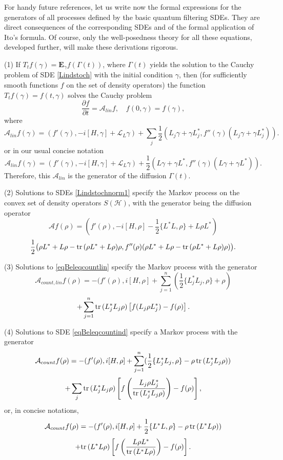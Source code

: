 \documentclass[12pt]{article}
\def\AC{\mathcal{A}}
\def\LC{\mathcal{L}}
\def\HC{\mathcal{H}}
\def\E{\mathbf{E}}
\def\tr{\rm{tr}}
\def\pa{\partial}
\def\ga{\gamma}
\newcommand{\Ga}{\Gamma}
\begin{document}
For handy future references, let us write now the formal expressions for the generators of all processes
defined by the basic quantum filtering SDEs. They are direct consequences of the corresponding SDEs
and of the formal application of Ito's formula. Of course, only the well-posedness theory for all these equations,
developed further, will make these derivations rigorous.

(1) If $T_tf(\ga)=\E_{\ga} f(\Ga(t))$, where $\Ga(t)$ yields the solution
to the Cauchy problem of SDE \eqref{Lindstoch} with the initial condition $\ga$,
then (for sufficiently smooth functions $f$ on the set of density operators)
the function $T_tf(\ga)=f(t,\ga)$ solves the Cauchy problem
\begin{equation}
\label{eqCauchylinfilt}
\frac{\pa f}{\pa t}=\AC_{lin} f, \quad f(0,\ga)=f(\ga),
\end{equation}
where
\begin{equation}
\label{eqgenlinfilt1}
\AC_{lin} f(\ga)= (f'(\ga), -i[H,\ga] +\LC_L \ga) + \sum_j \frac12 (L_j\ga+\ga L_j^*, f''(\ga) (L_j\ga+\ga L_j^*)).
\end{equation}
or in our usual concise notation
\begin{equation}
\label{eqgenlinfilt}
\AC_{lin} f(\ga)= (f'(\ga), -i[H,\ga] +\LC_L \ga) + \frac12 (L\ga+\ga L^*, f''(\ga) (L\ga+\ga L^*)).
\end{equation}
Therefore, this $\AC_{lin}$ is the generator of the diffusion $\Ga(t)$.

(2) Solutions to SDEs  \eqref{Lindstochnorm1} specify the Markov process on the convex
set of density operators  $S(\HC)$, with the generator
being the diffusion operator
\[
\AC f(\rho)=(f'(\rho),-i[H, \rho] -\frac12 \{L^*L,\rho\}+ L\rho L^*)
\]
\begin{equation}
\label{eqdifgener}
\frac12 \bigl(\rho L^* + L\rho-{\tr}\,(\rho L^* +L\rho)  \rho,
f''(\rho) (\rho L^* + L\rho-{\tr}\,(\rho L^* +L\rho)  \rho)\bigr).
\end{equation}

(3) Solutions to \eqref{eqBeleqcountlin} specify the Markov process with the generator
\[
\AC_{count,lin}f(\rho)=-(f'(\rho), i[H, \rho]
+\sum_{j=1}^n \left(\frac12 \{L_j^*L_j,\rho\}+ \rho\right)
\]
 \begin{equation}
\label{eqjumpgenerlin}
+ \sum_{j=1}^n {\tr}\, (L_j^*L_j\rho)\left[f(L_j\rho L_j^*)-f(\rho)\right].
\end{equation}

(4) Solutions to SDE \eqref{eqBeleqcountind}
specify a Markov process with the generator
\[
\AC_{count}f(\rho)=-(f'(\rho), i[H, \rho] +\sum_{j=1}^n (\frac12 \{L_j^*L_j,\rho\}-\rho \, {\tr}\, (L_j^*L_j\rho))
\]
\begin{equation}
\label{eqjumpgenerj}
+\sum_j {\tr}\, (L_j^*L_j\rho) \left[f\left(\frac{L_j\rho L_j^*}{{\tr}\, (L_j^*L_j\rho)}\right)-f(\rho)\right],
\end{equation}
or, in concise notations,
 \[
\AC_{count}f(\rho)=-(f'(\rho), i[H, \rho] + \frac12 \{L^*L,\rho\}-\rho \, {\tr}\, (L^*L\rho))
\]
 \begin{equation}
\label{eqjumpgener}
+ {\tr}\, (L^*L\rho)\left[f\left(\frac{L\rho L^*}{{\tr}\, (L^*L\rho)}\right)-f(\rho)\right].
\end{equation}
\end{document}

